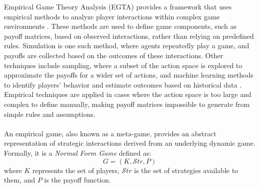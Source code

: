 \begin{flushleft}

    Empirical Game Theory Analysis (EGTA) provides a framework that uses empirical methods to analyze player interactions within complex game environments \cite{Levet2016GameT}. These methods are used to define game components, such as payoff matrices, based on observed interactions, rather than relying on predefined rules. Simulation is one such method, where agents repeatedly play a game, and payoffs are collected based on the outcomes of these interactions. Other techniques include sampling, where a subset of the action space is explored to approximate the payoffs for a wider set of actions, and machine learning methods to identify players' behavior and estimate outcomes based on historical data \cite{wellman2024empiricalgametheoreticanalysissurvey}. Empirical techniques are applied in cases where the action space is too large and complex to define manually, making payoff matrices impossible to generate from simple rules and assumptions.\\~\\

    An empirical game, also known as a meta-game, provides an abstract representation of strategic interactions derived from an underlying dynamic game. Formally, it is a \emph{Normal Form Game} defined as:
    \begin{equation}
        G = (K, \mathcal{S}tr, P)
        \label{eq:nfg}
    \end{equation}        
    where $K$ represents the set of players, $\mathcal{S}tr$ is the set of strategies available to them, and $P$ is the payoff function.\\~\\
    

\end{flushleft}
